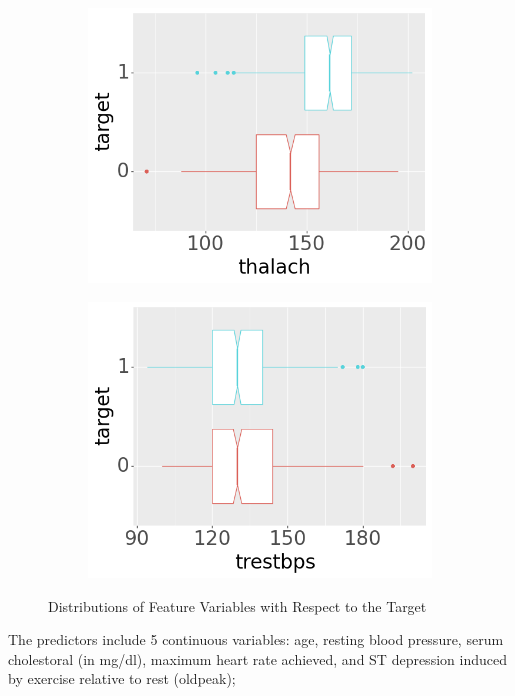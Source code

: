 \begin{figure}[btp]
\begin{subfigure}[b]{0.32\textwidth}
         \includegraphics[width=\textwidth]{plots/target-thalach}
     \end{subfigure}

     \begin{subfigure}[b]{0.32\textwidth}
         \centering
         \includegraphics[width=\textwidth]{plots/target-trestbps}
     \end{subfigure}

     \caption[Figure]{Distributions of Feature Variables with Respect to the Target} \label{fig:subdistributions}
\end{figure}
The predictors include 5 continuous variables: age, resting blood pressure, serum cholestoral (in mg/dl), maximum heart rate achieved, and ST depression induced by exercise relative to rest (oldpeak);

